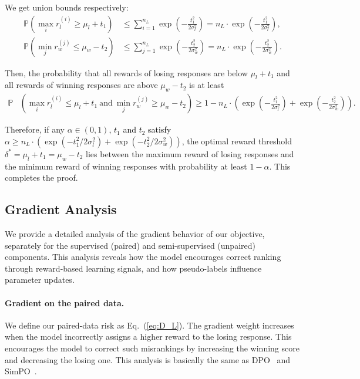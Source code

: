 \documentclass{article} %
\newcommand\fix[1]{\textcolor{black}{#1}}
\begin{document}
We get union bounds respectively:
\begin{align*}
    \mathbb{P} \left( \max_{i} r_l^{(i)} \geq \mu_l + t_1 \right) &\leq \sum_{i=1}^{n_L} \exp\left( -\frac{t_1^2}{2\sigma_l^2} \right) = n_L \cdot \exp\left( -\frac{t_1^2}{2\sigma_l^2} \right), \\
    \mathbb{P} \left( \min_{j} r_w^{(j)} \leq \mu_w - t_2 \right) &\leq \sum_{j=1}^{n_L} \exp\left( -\frac{t_2^2}{2\sigma_w^2} \right) = n_L \cdot \exp\left( -\frac{t_2^2}{2\sigma_w^2} \right).
\end{align*}

Then, the probability that all rewards of losing responses are below $\mu_l + t_1$ and all rewards of winning responses are above $\mu_w - t_2$ is at least
\begin{align*}
    \mathbb{P}&\left( \max_{i} r_l^{(i)} \leq \mu_l + t_1 \ \text{and} \ \min_{j} r_w^{(j)} \geq \mu_w - t_2 \right) \geq 1 - n_L \cdot \left( \exp\left( -\frac{t_1^2}{2\sigma_l^2} \right) + \exp\left( -\frac{t_2^2}{2\sigma_w^2} \right) \right).
\end{align*}

Therefore, if any $\alpha \in (0,1)$\fix{, $t_1$ and $t_2$ satisfy} $\alpha \geq n_L\cdot ( \exp( -{t_1^2}/{2\sigma_l^2}) + \exp( -{t_2^2}/{2\sigma_w^2}))$, the optimal reward threshold $\delta^* = \mu_l + t_1 = \mu_w - t_2$ lies between the maximum reward of losing responses and the minimum reward of winning responses with probability at least $1 - \alpha$. This completes the proof.

\subsection{Gradient Analysis}
\label{appendix:gradient}
We provide a detailed analysis of the gradient behavior of our objective, separately for the supervised (paired) and semi-supervised (unpaired) components. This analysis reveals how the model encourages correct ranking through reward-based learning signals, and how pseudo-labels influence parameter updates.

\paragraph{Gradient on the paired data.}  
We define our paired-data risk as Eq.~(\ref{eq:D_L}). The gradient weight increases when the model incorrectly assigns a higher reward to the losing response. This encourages the model to correct such misrankings by increasing the winning score and decreasing the losing one. This analysis is basically the same as DPO~\citep{rafailov2024direct} and SimPO~\citep{meng2024simposimplepreferenceoptimization}.
\end{document}
